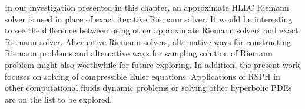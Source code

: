 In our investigation presented in this chapter, an approximate HLLC Riemann solver is used in place of exact iterative Riemann solver. It would be interesting to see the difference between using other approximate Riemann solvers and exact Riemann solver. Alternative Riemann solvers, alternative ways for constructing Riemann problems and alternative ways for sampling solution of Riemann problem might also worthwhile for future exploring. In addition, the present work focuses on solving of compressible Euler equations. Applications of RSPH in other computational fluids dynamic problems or solving other hyperbolic PDEs are on the list to be explored.